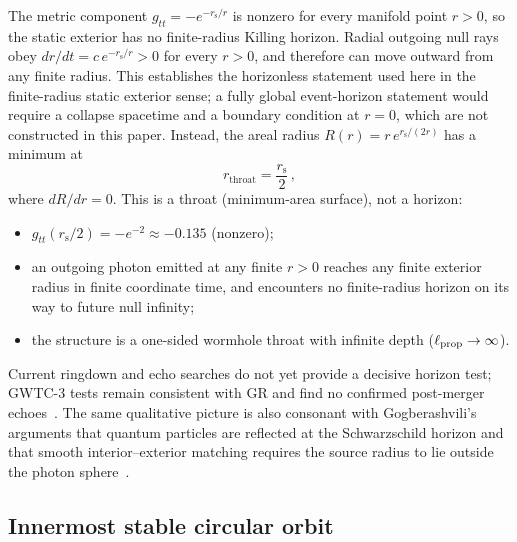 \documentclass[aps,prd,onecolumn,superscriptaddress,nofootinbib,showpacs,12pt]{revtex4-2}
\newcommand{\rs}{r_{\mathrm{s}}}
\begin{document}
The metric component $g_{tt}=-e^{-\rs/r}$ is nonzero
for every manifold point $r>0$, so the static exterior has
no finite-radius Killing horizon.  Radial outgoing null rays obey
$dr/dt=c\,e^{-\rs/r}>0$ for every $r>0$, and therefore can move
outward from any finite radius.  This establishes the horizonless
statement used here in the finite-radius static exterior sense; a
fully global event-horizon statement would require a collapse
spacetime and a boundary condition at $r=0$, which are not
constructed in this paper.  Instead, the areal radius
$R(r) = r\,e^{\rs/(2r)}$ has a minimum at
\begin{equation}\label{eq:throat}
  r_{\mathrm{throat}} = \frac{\rs}{2}\,,
\end{equation}
where $dR/dr = 0$.  This is a throat (minimum-area surface),
not a horizon:
\begin{itemize}
\item $g_{tt}(\rs/2) = -e^{-2} \approx -0.135$ (nonzero);
\item an outgoing photon emitted at any finite $r>0$ reaches
  any finite exterior radius in finite coordinate time, and
  encounters no finite-radius horizon on its way to future
  null infinity;
\item the structure is a one-sided wormhole throat with
  infinite depth ($\ell_{\rm prop} \to \infty$).
\end{itemize}

Current ringdown and echo searches do not yet provide a decisive
horizon test; GWTC-3 tests remain consistent with GR and find no
confirmed post-merger echoes~\cite{Cardoso2019,Miani2023,LVK2025TGR}.
The same qualitative picture
is also consonant with Gogberashvili's arguments that quantum
particles are reflected at the Schwarzschild horizon and that
smooth interior--exterior matching requires the source radius
to lie outside the photon sphere~\cite{Gogberashvili2018,Gogberashvili2019}.

\subsection{Innermost stable circular orbit}\label{sec:isco}
\end{document}
